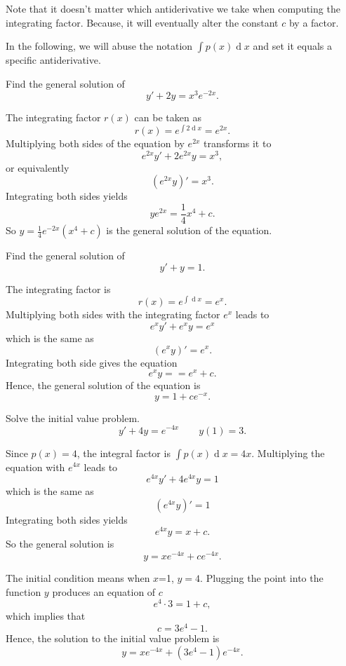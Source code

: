 \begin{remark}
  Note that it doesn't matter which antiderivative we take when computing the integrating factor. Because, it will eventually alter the constant $c$ by a factor.
\end{remark}

In the following, we will abuse the notation $\int p(x)\operatorname{d} x$ and set it equals a specific antiderivative.

\begin{example}
  Find the general solution of
\[y'+2y=x^3e^{-2x}.\]
\end{example}
\begin{solution}
The integrating factor $r(x)$ can be taken as
\[r(x)=e^{\int 2\operatorname{d} x}= e^{2x}.\]
Multiplying both sides of the equation by $e^{2x}$ transforms it to
\[e^{2x}y'+2e^{2x}y=x^3,\]
or equivalently
\[\left(e^{2x}y\right)'=x^3.\]
Integrating both sides yields
\[ye^{2x}=\frac14x^4+c.\]
So $y=\frac14e^{-2x}(x^4+c)$ is the general solution of the equation.
\end{solution}

\begin{exercise}
  Find the general solution of 
\[ y'  + y =1.\]
\end{exercise}
\begin{exersol}
  The integrating factor is
  \[r(x)=e^{\int \operatorname{d} x}=e^x.\]
Multiplying both sides with the integrating factor $e^x$ leads to
\[e^x y' + e^x y = e^x\]
which is the same as
\[(e^x y)' = e^x.\]
Integrating both side gives the equation
\[  e^x y = = e^x +c .\]
Hence, the general solution of the equation is
\[y = 1 + c e^{-x}.\]
\end{exersol}

\begin{example}
  Solve the initial value problem. 
\[y'+4y=e^{-4x}\qquad y(1)=3.\]
\end{example}
\begin{solution}
  Since $p(x)=4$, the integral factor is $\int p(x) \operatorname{d} x = 4x$.
  Multiplying the equation with $e^{4x}$ leads to
    \[e^{4x} y'+ 4 e^{4x} y  =   1\]
    which is the same as
    \[( e^{4x} y)'   =1\]
    Integrating both sides yields 
    \[e^{4x} y = x + c.\]
    So the general solution is
    \[y= x e^{-4x} + c e^{-4x}.\]

The initial condition means when $x$=1, $y=4$. Plugging the point into the function $y$ produces an equation of $c$
\[  e^{4}\cdot 3 = 1 + c,\]
which implies that 
\[c=3e^4-1.\]
Hence, the solution to the initial value problem is
\[y=xe^{-4x}+(3e^4-1)e^{-4x}.\]
\end{solution}

